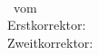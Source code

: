 \begin{titlepage}
	\thesisDate \\

\end{titlepage}


\hfill
\vfill
{
	\small
	\textbf{\thesisName} \\
	\textit{\thesisTitle} \\
	\thesisSubject\ vom \thesisDate \\
	Erstkorrektor: \thesisReviewer \\
	Zweitkorrektor: \thesisSupervisor \\[1.5em]
	\textbf{\thesisUniversity} \\
	\textit{\thesisUniversityGroup} \\
	\thesisUniversityInstitute \\
	\thesisUniversityDepartment \\
	\thesisUniversityStreetAddress \\
	\thesisUniversityPostalCode\ \thesisUniversityCity
}
